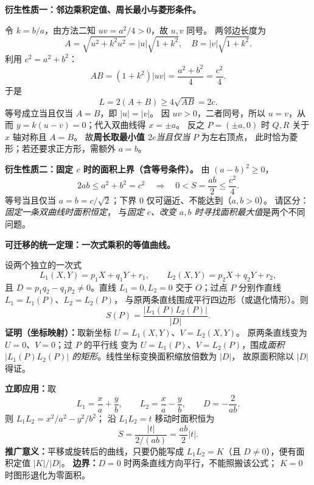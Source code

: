 \clearpage
\begin{proofbox}
\textbf{衍生性质一：邻边乘积定值、周长最小与菱形条件。}

令 $k=b/a$，由方法二知 $uv=a^2/4>0$，故 $u,v$ 同号。
两邻边长度为
\[
A=\sqrt{u^2+k^2u^2}=|u|\sqrt{1+k^2},\quad
B=|v|\sqrt{1+k^2}.
\]
利用 $c^2=a^2+b^2$：
\[
\boxed{AB=(1+k^2)|uv|=\frac{a^2+b^2}{4}=\frac{c^2}{4}}.
\]
于是
\[
\boxed{L=2(A+B)\ge4\sqrt{AB}=2c}.
\]
等号成立当且仅当 $A=B$，即 $|u|=|v|$。
因 $uv>0$，二者同号，所以 $u=v$，从而
$y=k(u-v)=0$；代入双曲线得 $x=\pm a$。
反之 $P=(\pm a,0)$ 时 $Q,R$ 关于 $x$ 轴对称且 $A=B$。
故\textbf{周长取最小值 $2c$}\emph{当且仅当} $P$ 为左右顶点，
此时恰为菱形；若还要求正方形，需额外 $a=b$。

\medskip
\textbf{衍生性质二：固定 $c$ 时的面积上界（含等号条件）。}
由 $(a-b)^2\ge0$，
\[
2ab\le a^2+b^2=c^2\quad\Longrightarrow\quad
\boxed{0<S=\frac{ab}{2}\le\frac{c^2}{4}}.
\]
等号当且仅当 $a=b=c/\sqrt2$；下界 $0$ 仅可逼近、不能达到（$a,b>0$）。
请区分：\emph{固定一条双曲线时面积恒定}，
与\emph{固定 $c$、改变 $a,b$ 时寻找面积最大值}是两个不同问题。
\end{proofbox}

\clearpage
\begin{proofbox}
\textbf{可迁移的统一定理：一次式乘积的等值曲线。}

设两个独立的一次式
\[
L_1(X,Y)=p_1X+q_1Y+r_1,\qquad
L_2(X,Y)=p_2X+q_2Y+r_2,
\]
且 $D=p_1q_2-q_1p_2\ne0$。直线 $L_1=0,L_2=0$
交于 $O$；过点 $P$ 分别作直线 $L_1=L_1(P)$、$L_2=L_2(P)$，
与原两条直线围成平行四边形（或退化情形）。则
\[
\boxed{S(P)=\frac{|L_1(P)L_2(P)|}{|D|}}.
\]
\textbf{证明（坐标映射）：}取新坐标 $U=L_1(X,Y)$、$V=L_2(X,Y)$。
原两条直线变为 $U=0$、$V=0$；过 $P$ 的平行线
变为 $U=L_1(P)$、$V=L_2(P)$，围成\emph{面积
$|L_1(P)L_2(P)|$ 的矩形}。线性坐标变换面积缩放倍数为 $|D|$，
故原面积除以 $|D|$ 得证。

\textbf{立即应用：}取
\[
L_1=\frac xa+\frac yb,\qquad
L_2=\frac xa-\frac yb,\qquad
D=-\frac{2}{ab}.
\]
则 $L_1L_2=x^2/a^2-y^2/b^2$；
沿 $L_1L_2=t$ 移动时面积恒为
\[
\boxed{S=\frac{|t|}{2/(ab)}=\frac{ab}{2}|t|}.
\]
\textbf{推广意义：}平移或旋转后的曲线，只要仍能写成
$L_1L_2=K$（且 $D\ne0$），便有面积定值 $|K|/|D|$。
\textbf{边界：}$D=0$ 时两条直线方向平行，不能照搬该公式；
$K=0$ 时图形退化为零面积。
\end{proofbox}
